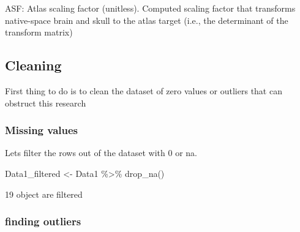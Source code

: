 \documentclass[
]{article}
\newenvironment{Shaded}{\begin{snugshade}}{\end{snugshade}}
\newcommand{\FunctionTok}[1]{\textcolor[rgb]{0.00,0.00,0.00}{#1}}
\newcommand{\NormalTok}[1]{#1}
\newcommand{\OtherTok}[1]{\textcolor[rgb]{0.56,0.35,0.01}{#1}}
\newcommand{\SpecialCharTok}[1]{\textcolor[rgb]{0.00,0.00,0.00}{#1}}
\begin{document}
ASF: Atlas scaling factor (unitless). Computed scaling factor that
transforms native-space brain and skull to the atlas target (i.e., the
determinant of the transform matrix)

\hypertarget{cleaning}{%
\subsection{Cleaning}\label{cleaning}}

First thing to do is to clean the dataset of zero values or outliers
that can obstruct this research

\hypertarget{missing-values}{%
\subsubsection{Missing values}\label{missing-values}}

Lets filter the rows out of the dataset with 0 or na.

\begin{Shaded}
\begin{Highlighting}[]
\NormalTok{Data1\_filtered }\OtherTok{\textless{}{-}}\NormalTok{ Data1 }\SpecialCharTok{\%\textgreater{}\%} \FunctionTok{drop\_na}\NormalTok{()}
\end{Highlighting}
\end{Shaded}

19 object are filtered

\hypertarget{finding-outliers}{%
\subsubsection{finding outliers}\label{finding-outliers}}
\end{document}
